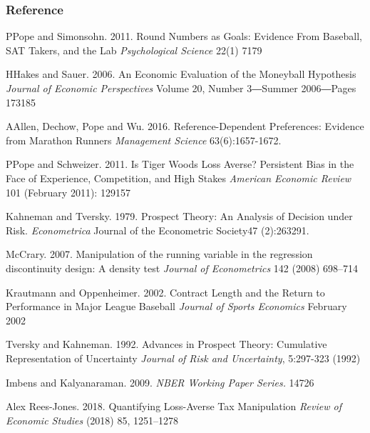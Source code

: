 \documentclass[dvipdfmx,12pt]{beamer}
\begin{document}
\begin{frame}\frametitle{Reference}
  \tiny
  \begin{thebibliography}{99}
    \bibitem PPope and Simonsohn. 2011.
    Round Numbers as Goals: Evidence From Baseball, SAT Takers, and the Lab
    \textit{Psychological Science} 22(1) 7179

    \bibitem HHakes and Sauer. 2006.
    An Economic Evaluation of the Moneyball Hypothesis
    \textit{Journal of Economic Perspectives} Volume 20, Number 3―Summer 2006―Pages 173185

    \bibitem AAllen, Dechow, Pope and Wu. 2016.
    Reference-Dependent Preferences: Evidence from Marathon Runners \textit{Management Science} 63(6):1657-1672.

    \bibitem PPope and Schweizer. 2011.
    Is Tiger Woods Loss Averse? Persistent Bias in the Face of Experience, Competition, and High Stakes
    \textit{American Economic Review} 101 (February 2011): 129157

    \bibitem{}Kahneman and Tversky. 1979.
    Prospect Theory: An Analysis of Decision under Risk.
    \textit{Econometrica}
    Journal of the Econometric Society47 (2):263291.

    \bibitem{}McCrary. 2007.
    Manipulation of the running variable in the regression discontinuity design: A density test
    \textit{Journal of Econometrics} 142 (2008) 698–714

    \bibitem{}Krautmann and Oppenheimer. 2002.
    Contract Length and the Return to Performance in Major League Baseball
    \textit{Journal of Sports Economics} February 2002

    \bibitem{}Tversky and Kahneman. 1992.
    Advances in Prospect Theory: Cumulative Representation of Uncertainty
    \textit{Journal of Risk and Uncertainty}, 5:297-323 (1992)

    \bibitem{}Imbens and Kalyanaraman. 2009.
    \textit{NBER Working Paper Series.} 14726

    \bibitem{}Alex Rees-Jones. 2018.
    Quantifying Loss-Averse Tax Manipulation
    \textit{Review of Economic Studies} (2018) 85, 1251–1278
  \end{thebibliography}

\end{frame}
\end{document}
